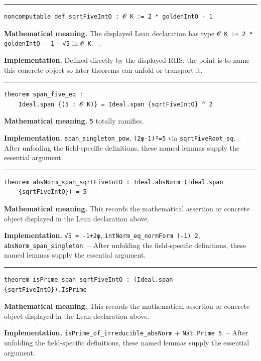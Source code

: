 \documentclass[UTF8,a4paper,11pt,fontset=fandol]{ctexart}
\theoremstyle{definition}
\newcommand{\statementsep}{\par\medskip\hrule\medskip}
\begin{document}
\statementsep
\begin{verbatim}
noncomputable def sqrtFiveIntO : 𝓞 K := 2 * goldenIntO - 1
\end{verbatim}
\noindent\textbf{Mathematical meaning.} The displayed Lean declaration has type \texttt{𝓞 K := 2 * goldenIntO - 1} -- \texttt{√5} in \texttt{𝓞 K}. --.\par
\noindent\textbf{Implementation.} Defined directly by the displayed RHS; the point is to name this concrete object so later theorems can unfold or transport it.\par
\statementsep
\begin{verbatim}
theorem span_five_eq :
    Ideal.span {(5 : 𝓞 K)} = Ideal.span {sqrtFiveIntO} ^ 2
\end{verbatim}
\noindent\textbf{Mathematical meaning.} \texttt{5} totally ramifies.\par
\noindent\textbf{Implementation.} \texttt{span\_\allowbreak{}singleton\_\allowbreak{}pow}, \texttt{(2φ-1)²=5} via \texttt{sqrtFiveRoot\_\allowbreak{}sq}. -- After unfolding the field-specific definitions, these named lemmas supply the essential argument.\par
\statementsep
\begin{verbatim}
theorem absNorm_span_sqrtFiveIntO : Ideal.absNorm (Ideal.span
    {sqrtFiveIntO}) = 5
\end{verbatim}
\noindent\textbf{Mathematical meaning.} This records the mathematical assertion or concrete object displayed in the Lean declaration above.\par
\noindent\textbf{Implementation.} \texttt{√5 = -1+2φ}, \texttt{intNorm\_\allowbreak{}eq\_\allowbreak{}normForm (-1) 2}, \texttt{absNorm\_\allowbreak{}span\_\allowbreak{}singleton}. -- After unfolding the field-specific definitions, these named lemmas supply the essential argument.\par
\statementsep
\begin{verbatim}
theorem isPrime_span_sqrtFiveIntO : (Ideal.span {sqrtFiveIntO}).IsPrime
\end{verbatim}
\noindent\textbf{Mathematical meaning.} This records the mathematical assertion or concrete object displayed in the Lean declaration above.\par
\noindent\textbf{Implementation.} \texttt{isPrime\_\allowbreak{}of\_\allowbreak{}irreducible\_\allowbreak{}absNorm} + \texttt{Nat.\allowbreak{}Prime 5}. -- After unfolding the field-specific definitions, these named lemmas supply the essential argument.\par
\end{document}
